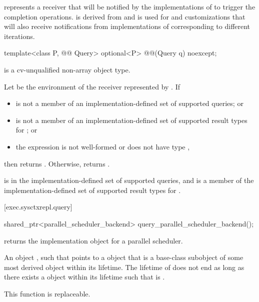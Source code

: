\pnum
{} represents a receiver
that will be notified
by the implementations of 
to trigger the completion operations.
 is derived from  and
is used for  and  customizations
that will also receive notifications
from implementations of 
corresponding to different iterations.

\begin{itemdecl}
template<class P, @@ Query>
  optional<P> @@(Query q) noexcept;
\end{itemdecl}

\begin{itemdescr}
\pnum
\mandates
{} is a cv-unqualified non-array object type.

\pnum
\returns
Let  be the environment of the receiver represented by .
If
\begin{itemize}
\item
{} is not a member of an implementation-defined set
of supported queries; or
\item
{} is not a member of an implementation-defined set
of supported result types for ; or
\item
the expression  is not well-formed or
does not have type \cv{} ,
\end{itemize}
then returns .
Otherwise, returns .

\pnum
\remarks
{} is
in the implementation-defined set of supported queries, and
 is a member
of the implementation-defined set of supported result types
for .
\end{itemdescr}

[exec.sysctxrepl.query]{}

%
\begin{itemdecl}
shared_ptr<parallel_scheduler_backend> query_parallel_scheduler_backend();
\end{itemdecl}

\begin{itemdescr}
\pnum
{} returns
the implementation object for a parallel scheduler.

\pnum
\returns
An object ,
such that  points to a  object
that is a base-class subobject
of some most derived object  within its lifetime.
The lifetime of  does not end
as long as there exists a  object  within its lifetime
such that  is .

\pnum
\remarks
This function is replaceable.
\end{itemdescr}

